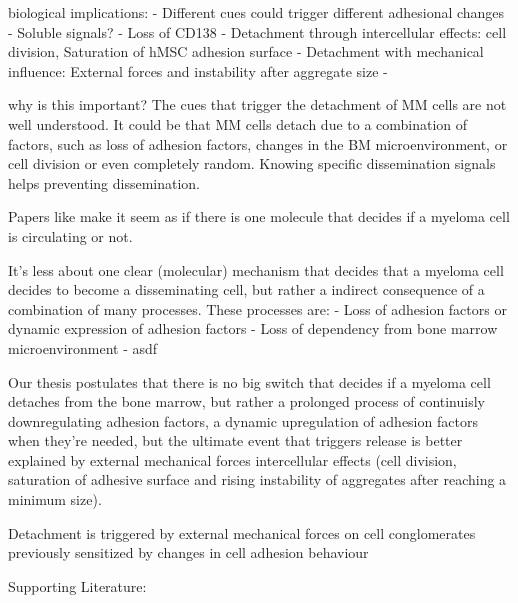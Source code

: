 \unnsubsection{\caddtriggertitle}%
\label{sec:discussion_caddtrigger}%

biological implications:
- Different cues could trigger different adhesional changes
- Soluble signals?
- Loss of CD138 \cite{akhmetzyanovaDynamicCD138Surface2020}
- Detachment through intercellular effects: cell division, Saturation of hMSC adhesion surface
- Detachment with mechanical influence: External forces and instability after aggregate size
-


why is this important?
The cues that trigger the detachment of MM cells are not well understood. It
could be that MM cells detach due to a combination of factors, such as loss of
adhesion factors, changes in the BM microenvironment, or cell division or
even completely random. Knowing specific dissemination signals helps preventing
dissemination.


Papers like \citet{akhmetzyanovaDynamicCD138Surface2020} make it seem as if
there is one molecule that decides if a myeloma cell is circulating or not.

It's less about one clear (molecular) mechanism that decides that a myeloma cell
decides to become a disseminating cell, but rather a indirect consequence of a combination of many
processes.
These processes are:
- Loss of adhesion factors or dynamic expression of adhesion factors
- Loss of dependency from bone marrow microenvironment
- asdf

Our thesis postulates that there is no big switch that decides if a myeloma cell
detaches from the bone marrow, but rather a prolonged process of continuisly
downregulating adhesion factors, a dynamic upregulation of adhesion factors when
they're needed, but the ultimate event that triggers release is better
explained by external mechanical forces intercellular effects (cell division,
saturation of adhesive surface and rising instability of aggregates after
reaching a minimum size).

Detachment is triggered by external mechanical forces on cell
conglomerates previously sensitized by changes in cell adhesion behaviour

Supporting Literature:

